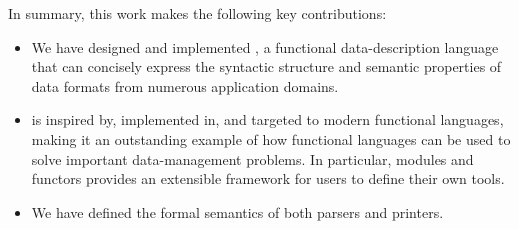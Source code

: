 

In summary, this work makes the following key contributions:
\begin{itemize}
\item We have designed and implemented \padsml{}, a functional
data-description language that can concisely express the syntactic
structure and semantic properties of data formats from numerous
application domains.
\item \padsml{} is inspired by, implemented in, and targeted to modern
functional languages, making it an outstanding example of how
functional languages can be used to solve
important data-management problems.  In particular, \ml{} modules and
functors provides an extensible framework for \padsml{} users to define their
own \padsml{} tools. 
\item We have defined the formal semantics of both \padsml{} parsers 
and printers.
\end{itemize}

